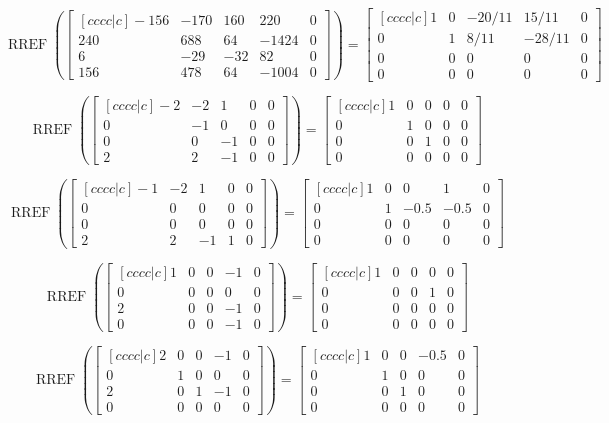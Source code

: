 \documentclass{article}
\DeclareMathOperator{\RREF}{RREF}
\begin{document}
\[
\RREF\left(
\begin{bmatrix} [cccc|c]
-156& -170 & 160 & 220 &0  \\
240 & 688& 64 & -1424 &0  \\
6 & -29 & -32 & 82 &0 \\
156 & 478 & 64 &-1004 &0
\end{bmatrix}
\right) =
  \begin{bmatrix}[cccc|c]
    1 & 0 & -20/11 & 15/11 & 0 \\
    0 & 1 & 8/11 & -28/11 & 0 \\
    0 & 0 & 0 & 0 & 0 \\
    0 & 0 & 0 & 0 & 0
  \end{bmatrix}
\]


\[
\RREF\left(
\begin{bmatrix} [cccc|c]
-2 & -2 & 1 & 0 & 0 \\ 
0 & -1 & 0 & 0 &0 \\ 
0 & 0 & -1 & 0 & 0 \\ 
2 & 2 & -1 & 0 &0 
\end{bmatrix}
\right) =
  \begin{bmatrix}[cccc|c]
    1 & 0 & 0& 0 & 0 \\
    0 & 1 & 0 & 0 & 0 \\
    0 & 0 & 1 & 0 & 0 \\
    0 & 0 & 0 & 0 & 0
  \end{bmatrix}
\]

\[
\RREF\left(
\begin{bmatrix} [cccc|c]
-1& -2 & 1 & 0 & 0 \\
 0 & 0& 0 & 0 &0 \\ 
 0 & 0 &0 & 0 & 0 \\ 
 2 & 2 & -1 & 1 &0 \end{bmatrix}
\right) =
  \begin{bmatrix}[cccc|c]
    1 & 0 & 0& 1 & 0 \\
    0 & 1 & -0.5 & -0.5 & 0 \\
    0 & 0 & 0 & 0 & 0 \\
    0 & 0 & 0 & 0 & 0
  \end{bmatrix}
\]

\[
\RREF\left(
\begin{bmatrix}  [cccc|c]
 1  & 0  & 0 & -1 &0\\
0  & 0   & 0 &  0 & 0\\
2 &  0 &  0   &-1 & 0\\
 0  & 0&   0&   -1 & 0\end{bmatrix}
\right) =
  \begin{bmatrix}[cccc|c]
    1 & 0 & 0& 0 & 0 \\
    0 & 0 & 0 & 1 & 0 \\
    0 & 0 & 0 & 0 & 0 \\
    0 & 0 & 0 & 0 & 0
  \end{bmatrix}
\]

\[
\RREF\left(
\begin{bmatrix}  [cccc|c]
2 & 0  & 0 & -1 &0\\
0  & 1 & 0 &  0 & 0\\
2 &  0 &  1   &-1 & 0\\
 0  & 0&   0&   0  & 0\end{bmatrix}
\right) =
  \begin{bmatrix}[cccc|c]
    1 & 0 & 0& -0.5 & 0 \\
    0 & 1 & 0 & 0 & 0 \\
    0 & 0 & 1 & 0 & 0 \\
    0 & 0 & 0 & 0 & 0
  \end{bmatrix}
\]
\end{document}
